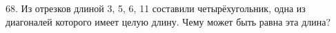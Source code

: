 68. Из отрезков длиной 3, 5, 6, 11 составили четырёхугольник, одна из диагоналей которого имеет целую длину. Чему может быть равна эта длина?\\
